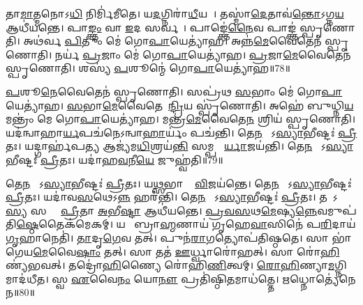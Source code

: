 𑌤𑌾\ul{𑌮𑌾}𑌤𑍍𑌮𑌨𑍋𑌽\ul{𑌧𑌿} 𑌨𑌿𑌰𑍍𑌮𑌿॑𑌮𑍀𑌤𑍇।
𑌯\ul{𑌦}𑌗𑍍𑌨𑌿𑌰𑌾॑\ul{𑌧𑍀}𑌯𑌤𑍇᳚।
𑌤𑌸𑍍𑌮𑌾॑\ul{𑌦𑍇}𑌤𑌾𑌵॑\ul{𑌨𑍍𑌤𑍋}\-𑌽𑌗𑍍𑌨\ul{𑌯} 𑌆𑌧𑍀॑𑌯𑌨𑍍𑌤𑍇।
𑌪𑌾\ul{𑌙𑍍𑌕𑍍𑌤𑌂} 𑌵𑌾 \ul{𑌇}𑌦 𑌸𑌰𑍍𑌵𑌮𑍍᳚।
𑌪𑌾𑌙𑍍𑌕𑍍𑌤𑍇॑\ul{𑌨𑍈}𑌵 𑌪𑌾𑌙𑍍𑌕𑍍𑌤॑ 𑌸𑍍𑌪𑍃𑌣𑍋𑌤𑌿।
𑌅𑌥॑𑌰𑍍𑌵 \ul{𑌪𑌿}𑌤𑍁𑌂 𑌮𑍇॑ 𑌗𑍋\ul{𑌪𑌾}𑌯𑍇𑌤𑍍𑌯𑌾॑𑌹।
𑌅𑌨𑍍𑌨॑\ul{𑌮𑍇}𑌵𑍈𑌤𑍇𑌨॑ 𑌸𑍍𑌪𑍃𑌣𑍋𑌤𑌿।
𑌨𑌰𑍍𑌯॑ \ul{𑌪𑍍𑌰}𑌜𑌾𑌂 𑌮𑍇॑ 𑌗𑍋\ul{𑌪𑌾}𑌯𑍇𑌤𑍍𑌯𑌾॑𑌹।
\ul{𑌪𑍍𑌰}𑌜𑌾\ul{𑌮𑍇}𑌵𑍈𑌤𑍇𑌨॑ 𑌸𑍍𑌪𑍃𑌣𑍋𑌤𑌿।
𑌶𑌸𑍍𑌯॑ \ul{𑌪}𑌶𑍂𑌨𑍍𑌮𑍇॑ 𑌗𑍋\ul{𑌪𑌾}𑌯𑍇𑌤𑍍𑌯𑌾॑𑌹॥78॥

\ul{𑌪}𑌶𑍂\ul{𑌨𑍇}𑌵𑍈𑌤𑍇𑌨॑ 𑌸𑍍𑌪𑍃𑌣𑍋𑌤𑌿।
𑌸𑌪𑍍𑌰॑𑌥 \ul{𑌸}𑌭𑌾𑌂 𑌮𑍇॑ 𑌗𑍋\ul{𑌪𑌾}𑌯𑍇𑌤𑍍𑌯𑌾॑𑌹।
\ul{𑌸}𑌭𑌾\ul{𑌮𑍇}𑌵𑍈𑌤𑍇𑌨𑍇᳚\ul{𑌨𑍍𑌦𑍍𑌰𑌿}𑌯 𑌸𑍍𑌪𑍃॑𑌣𑍋𑌤𑌿।
𑌅𑌹𑍇॑ 𑌬𑍁𑌧𑍍𑌨𑌿\ul{𑌯} 𑌮𑌨𑍍𑌤𑍍𑌰𑌂॑ 𑌮𑍇 𑌗𑍋\ul{𑌪𑌾}𑌯𑍇𑌤𑍍𑌯𑌾॑𑌹।
𑌮𑌨𑍍𑌤𑍍𑌰॑\ul{𑌮𑍇}𑌵𑍈𑌤𑍇\ul{𑌨} 𑌶𑍍𑌰𑌿𑌯॑ 𑌸𑍍𑌪𑍃𑌣𑍋𑌤𑌿।
𑌯𑌦॑𑌨𑍍𑌵𑌾𑌹𑌾\ul{𑌰𑍍𑌯}𑌪𑌚॑𑌨𑍇\-𑌽𑌨𑍍𑌵𑌾\ul{𑌹𑌾}𑌰𑍍𑌯𑌂॑ 𑌪𑌚॑𑌨𑍍𑌤𑌿।
𑌤𑍇\ul{𑌨} 𑌸𑍋᳚\-𑌽\ul{𑌸𑍍𑌯𑌾}𑌭𑍀𑌷𑍍𑌟𑌃॑ \ul{𑌪𑍍𑌰𑍀}𑌤𑌃।
𑌯𑌦𑍍𑌗𑌾𑌰𑍍\mbox{}𑌹॑𑌪\ul{𑌤𑍍𑌯} 𑌆𑌜𑍍𑌯॑𑌮\ul{𑌧𑌿}𑌶𑍍𑌰𑌯॑\ul{𑌨𑍍𑌤𑌿} 𑌸𑌮𑍍𑌪𑌤𑍍𑌨𑍀᳚\ul{𑌰𑍍𑌯𑌾}𑌜𑌯॑𑌨𑍍𑌤𑌿।
𑌤𑍇\ul{𑌨} 𑌸𑍋᳚\-𑌽\ul{𑌸𑍍𑌯𑌾}𑌭𑍀𑌷𑍍𑌟𑌃॑ \ul{𑌪𑍍𑌰𑍀}𑌤𑌃।
𑌯𑌦𑌾॑𑌹\ul{𑌵}𑌨𑍀\ul{𑌯𑍇} 𑌜𑍁𑌹𑍍𑌵॑𑌤𑌿॥79॥

𑌤𑍇\ul{𑌨} 𑌸𑍋᳚\-𑌽\ul{𑌸𑍍𑌯𑌾}𑌭𑍀𑌷𑍍𑌟𑌃॑ \ul{𑌪𑍍𑌰𑍀}𑌤𑌃।
𑌯\ul{𑌥𑍍𑌸}𑌭𑌾𑌯𑌾𑌂᳚ \ul{𑌵𑌿}𑌜𑌯॑𑌨𑍍𑌤𑍇।
𑌤𑍇\ul{𑌨} 𑌸𑍋᳚\-𑌽\ul{𑌸𑍍𑌯𑌾}𑌭𑍀𑌷𑍍𑌟𑌃॑ \ul{𑌪𑍍𑌰𑍀}𑌤𑌃।
𑌯𑌦𑌾॑𑌵\ul{𑌸}𑌥𑍇\-𑌽\ul{𑌨𑍍𑌨}\ul{} 𑌹𑌰॑𑌨𑍍𑌤𑌿।
𑌤𑍇\ul{𑌨} 𑌸𑍋᳚\-𑌽\ul{𑌸𑍍𑌯𑌾}𑌭𑍀𑌷𑍍𑌟𑌃॑ \ul{𑌪𑍍𑌰𑍀}𑌤𑌃।
𑌤𑌥𑌾᳚𑌽\ul{𑌸𑍍𑌯} 𑌸𑌰𑍍𑌵𑍇᳚ \ul{𑌪𑍍𑌰𑍀}𑌤𑌾 \ul{𑌅}𑌭𑍀\ul{𑌷𑍍𑌟𑌾} 𑌆𑌧𑍀॑𑌯𑌨𑍍𑌤𑍇।
\ul{𑌪𑍍𑌰}\ul{𑌵}\ul{𑌸}𑌥\ul{𑌮𑍇}𑌷𑍍𑌯\ul{𑌨𑍍𑌨𑍇}𑌵𑌮𑍁𑌪॑𑌤𑌿\ul{𑌷𑍍𑌠𑍇}𑌤𑍈𑌕॑𑌮𑍇𑌕𑌮𑍍।
𑌯𑌥𑌾᳚ 𑌬𑍍𑌰𑌾\ul{𑌹𑍍𑌮}𑌣𑌾𑌯॑ 𑌗𑍃𑌹𑍇\ul{𑌵𑌾}𑌸𑌿𑌨𑍇॑ 𑌪\ul{𑌰𑌿}𑌦𑌾𑌯॑ \ul{𑌗𑍃}𑌹𑌾𑌨𑍇𑌤𑌿॑।
\ul{𑌤𑌾}𑌦𑍃\ul{𑌗𑍇}𑌵 𑌤𑌤𑍍।
𑌪𑍁𑌨॑\ul{𑌰𑌾}𑌗𑌤𑍍𑌯𑍋𑌪॑𑌤𑌿𑌷𑍍𑌠𑌤𑍇।
𑌸𑌾 𑌭𑌾॑𑌗𑍇𑌯\ul{𑌮𑍇}𑌵𑍈\ul{𑌷𑌾𑌂} 𑌤𑌤𑍍।
𑌸𑌾 𑌤𑌤॑ \ul{𑌊}𑌰𑍍𑌧𑍍𑌵𑌾𑌰𑍋॑𑌹𑌤𑍍।
𑌸𑌾 𑌰𑍋॑\ul{𑌹𑌿}𑌣𑍍𑌯॑𑌭𑌵𑌤𑍍।
𑌤𑌦𑍍𑌰𑍋॑\ul{𑌹𑌿}𑌣𑍍𑌯𑍈 𑌰𑍋॑𑌹𑌿\ul{𑌣𑌿}𑌤𑍍𑌵𑌮𑍍।
\ul{𑌰𑍋}\ul{𑌹𑌿}𑌣𑍍𑌯𑌾\ul{𑌮}𑌗𑍍𑌨𑌿𑌮𑌾𑌦॑𑌧𑍀𑌤।
𑌸𑍍𑌵 \ul{𑌏}𑌵𑍈\ul{𑌨𑌂} 𑌯𑍋\ul{𑌨𑍗} 𑌪𑍍𑌰𑌤𑌿॑\-𑌷𑍍𑌠𑌿\ul{𑌤}𑌮𑌾𑌧॑𑌤𑍍𑌤𑍇।
\ul{𑌋}𑌧𑍍𑌨𑍋𑌤𑍍𑌯𑍇॑𑌨𑍇𑌨॥80॥\anuvakamend[\ul{𑌏}𑌷𑌾 \ul{𑌪}𑌶𑍂𑌨𑍍𑌮𑍇॑ 𑌗𑍋\ul{𑌪𑌾}𑌯𑍇\ul{𑌤𑌿} 𑌪𑍍𑌰𑌵𑌿॑𑌷𑍍𑌟𑌾 \ul{𑌪}𑌶𑍂𑌨𑍍𑌮𑍇॑ 𑌗𑍋\ul{𑌪𑌾}𑌯𑍇𑌤𑍍𑌯𑌾॑\ul{𑌹} 𑌜𑍁𑌹𑍍𑌵॑𑌤𑌿 𑌤𑌿𑌷𑍍𑌠𑌤𑍇 \ul{𑌸}𑌪𑍍𑌤 𑌚॑]





\clearpage
{}
\setcounter{anuvakam}{0}

